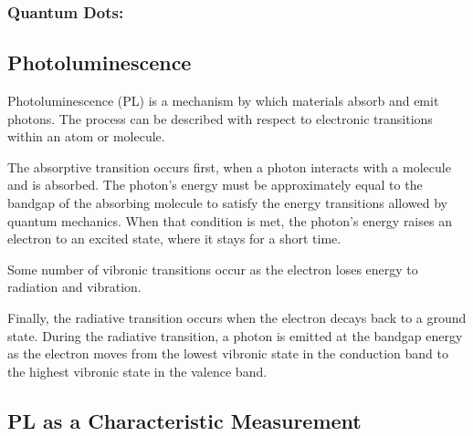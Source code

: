 \subsubsection{Quantum Dots: }

\subsection{Photoluminescence}
Photoluminescence (PL) is a mechanism by which materials absorb and emit photons. The process can be described with respect to electronic transitions within an atom or molecule.

The absorptive transition occurs first, when a photon interacts with a molecule and is absorbed. The photon's energy must be approximately equal to the bandgap of the absorbing molecule to satisfy the energy transitions allowed by quantum mechanics. When that condition is met, the photon's energy raises an electron to an excited state, where it stays for a short time.

Some number of vibronic transitions occur as the electron loses energy to radiation and vibration. 

Finally, the radiative transition occurs when the electron decays back to a ground state. During the radiative transition, a photon is emitted at the bandgap energy as the electron moves from the lowest vibronic state in the conduction band to the highest vibronic state in the valence band. 

\subsection{PL as a Characteristic Measurement}
